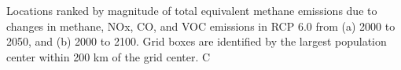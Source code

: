 Locations ranked by magnitude of total equivalent methane emissions due to changes in methane, NOx, CO, and VOC emissions in RCP 6.0 from (a) 2000 to 2050, and (b) 2000 to 2100. Grid boxes are identified by the largest population center within 200 km of the grid center. C~\label{fig:eqemsrank}
